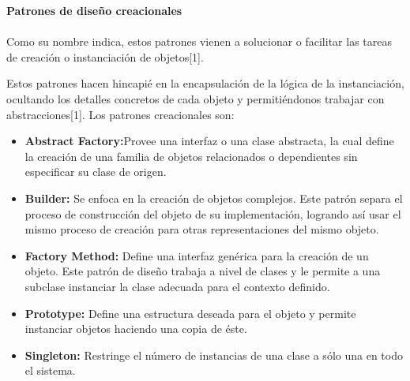 \documentclass[twoside,twocolumn]{article}
\begin{document}
    \item \textbf{Patrones de diseño creacionales} \\ \\
    Como su nombre indica, estos patrones vienen a solucionar o facilitar las tareas de creación o instanciación de objetos[1]. 

Estos patrones hacen hincapié en la encapsulación de la lógica de la instanciación, ocultando los detalles concretos de cada objeto y permitiéndonos trabajar con abstracciones[1]. Los patrones creacionales son: 
    \begin{itemize}
		\item \textbf{Abstract Factory:}Provee una interfaz o una clase abstracta, la cual define la creación de una familia de objetos relacionados o dependientes sin especificar su clase de origen. 
		\item \textbf{Builder:} Se enfoca en la creación de objetos complejos. Este patrón separa el proceso de construcción del objeto de su implementación, logrando así usar el mismo proceso de creación para otras representaciones del mismo objeto.  
		\item \textbf{Factory Method:} Define una interfaz genérica para la creación de un objeto. Este patrón de diseño trabaja a nivel de clases y le permite a una subclase instanciar la clase adecuada para el contexto definido.  
		\item \textbf{Prototype:}	Define una estructura deseada para el objeto y permite instanciar objetos haciendo una copia de éste.  
		\item \textbf{Singleton:} Restringe el número de instancias de una clase a sólo una en todo el sistema. 
    \end{itemize}
\end{document}
